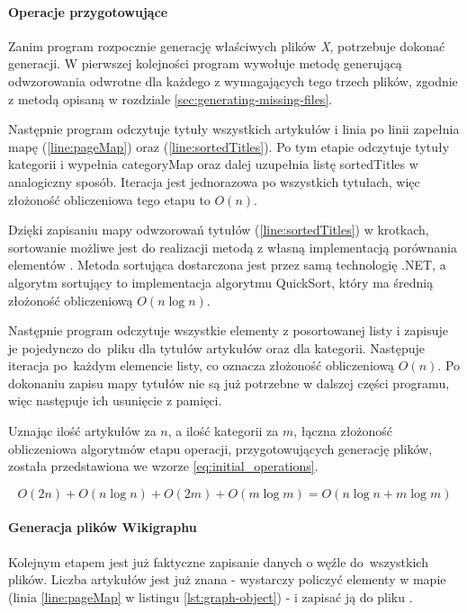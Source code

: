 \paragraph{Operacje przygotowujące}
Zanim program rozpocznie generację właściwych plików \textit{X}, potrzebuje dokonać generacji. W pierwszej kolejności program wywołuje metodę generującą odwzorowania odwrotne dla każdego z wymagających tego trzech plików, zgodnie z metodą opisaną w rozdziale \ref{sec:generating-missing-files}.

Następnie program odczytuje tytuły wszystkich artykułów i linia po linii zapełnia mapę  (\ref{line:pageMap}) oraz  (\ref{line:sortedTitles}). Po tym etapie odczytuje tytuły kategorii i wypełnia categoryMap oraz dalej uzupełnia listę sortedTitles w analogiczny sposób. Iteracja jest jednorazowa po wszystkich tytułach, więc złożoność obliczeniowa tego etapu to $O(n)$.

Dzięki zapisaniu mapy odwzorowań tytułów (\ref{line:sortedTitles}) w krotkach, sortowanie możliwe jest do realizacji metodą  z własną implementacją porównania elementów . Metoda sortująca dostarczona jest przez samą technologię .NET, a algorytm sortujący to implementacja algorytmu QuickSort, który ma średnią złożoność obliczeniową $O(n\log n)$.

Następnie program odczytuje wszystkie elementy z posortowanej listy i zapisuje je pojedynczo do~pliku  dla tytułów artykułów oraz  dla kategorii. Następuje iteracja po~każdym elemencie listy, co oznacza złożoność obliczeniową $O(n)$. Po dokonaniu zapisu mapy tytułów nie są już potrzebne w dalszej części programu, więc następuje ich usunięcie z pamięci.

Uznając ilość artykułów za $n$, a ilość kategorii za $m$, łączna złożoność obliczeniowa algorytmów etapu operacji, przygotowujących generację plików, została przedstawiona we wzorze \ref{eq:initial_operations}.

\begin{equation}
O(2n) + O(n\log n) + O(2m) + O(m \log m) = O(n\log n + m\log m)
\label{eq:initial_operations}
\end{equation}

\paragraph{Generacja plików Wikigraphu}
Kolejnym etapem jest już faktyczne zapisanie danych o węźle do~wszystkich plików. Liczba artykułów jest już znana - wystarczy policzyć elementy w mapie  (linia \ref{line:pageMap} w listingu \ref{lst:graph-object}) - i zapisać ją do pliku .

